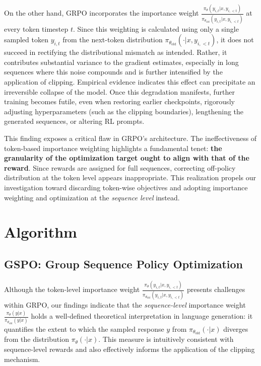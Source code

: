 On the other hand, GRPO incorporates the importance weight $\frac{ \pi_{\theta} (y_{i,t} | x, y_{i,<t}) }{ \pi_{\theta_\text{old}} (y_{i,t} | x,y_{i,<t})}$ at every token timestep $t$. Since this weighting is calculated using only a single sampled token $y_{i,t}$ from the next-token distribution $\pi_{\theta_\text{old}}( \cdot | x, y_{i, <t})$, it does not succeed in rectifying the distributional mismatch as intended. Rather, it contributes substantial variance to the gradient estimates, especially in long sequences where this noise compounds and is further intensified by the application of clipping. Empirical evidence indicates this effect can precipitate an irreversible collapse of the model. Once this degradation manifests, further training becomes futile, even when restoring earlier checkpoints, rigorously adjusting hyperparameters (such as the clipping boundaries), lengthening the generated sequences, or altering RL prompts.

This finding exposes a critical flaw in GRPO’s architecture. The ineffectiveness of token-based importance weighting highlights a fundamental tenet: \textbf{the granularity of the optimization target ought to align with that of the reward}. Since rewards are assigned for full sequences, correcting off-policy distribution at the token level appears inappropriate. This realization propels our investigation toward discarding token-wise objectives and adopting importance weighting and optimization at the \textit{sequence level} instead.

\section{Algorithm}

\subsection{GSPO: Group Sequence Policy Optimization}

Although the token-level importance weight $\frac{ \pi_{\theta} (y_{i,t} | x, y_{i,<t}) }{ \pi_{\theta_\text{old}} (y_{i,t} | x,y_{i,<t})}$ presents challenges within GRPO, our findings indicate that the \textit{sequence-level} importance weight $\frac{ \pi_{\theta} (y | x) }{ \pi_{\theta_\text{old}} (y | x)}$ holds a well-defined theoretical interpretation in language generation: it quantifies the extent to which the sampled response $y$ from $\pi_{\theta_\text{old}} (\cdot | x)$ diverges from the distribution $\pi_{\theta} (\cdot | x)$. This measure is intuitively consistent with sequence-level rewards and also effectively informs the application of the clipping mechanism.

